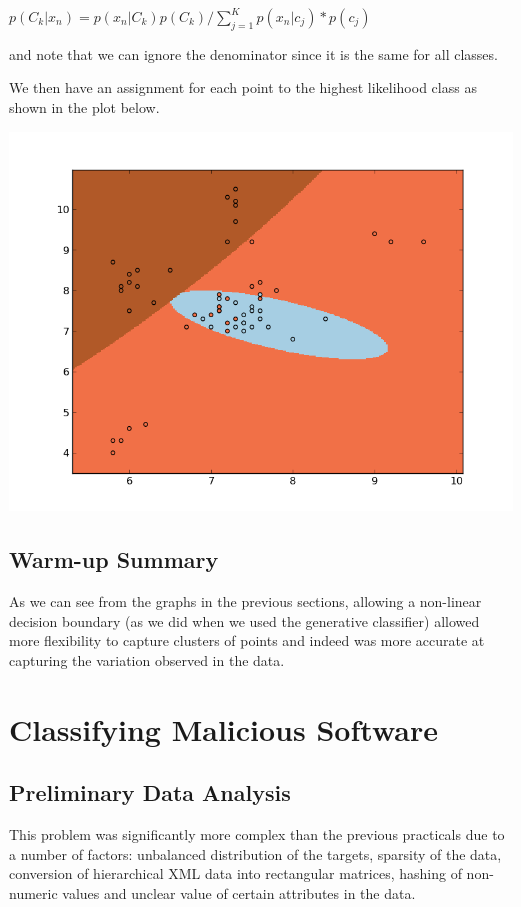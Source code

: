 \documentclass[11pt, oneside]{article}   	%
\begin{document}
$p(C_k |x_n) = p(x_n |C_k)  p(C_k) / \sum\limits_{j=1}^K p(x_n | c_j) * p(c_j)$

and note that we can ignore the denominator since it is the same for all classes.

We then have an assignment for each point to the highest likelihood class as shown in the plot below.

\begin{center}
\includegraphics[scale=.6]{generative_classifier}
\end{center}

\subsection*{Warm-up Summary}

As we can see from the graphs in the previous sections, allowing a non-linear decision boundary (as we did when we used the generative classifier) allowed more flexibility to capture clusters of points and indeed was more accurate at capturing the variation observed in the data.

\section*{Classifying Malicious Software}

\subsection*{Preliminary Data Analysis}

This problem was significantly more complex than the previous practicals due to a number of factors: unbalanced distribution of the targets, sparsity of the data, conversion of hierarchical XML data into rectangular matrices, hashing of non-numeric values and unclear value of certain attributes in the data. 
\end{document}
